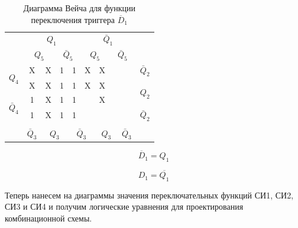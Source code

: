 \documentclass[a4paper,14pt]{article}
\begin{document}
\begin{table}[H]
	\begin{center}
		\caption{\label{tab:unD1_tab} Диаграмма Вейча для функции переключения триггера $\overline{D}_1$ }
	\begin{tabular}{cccccccccc}
		& \multicolumn{4}{c}{$Q_1$} & \multicolumn{4}{c}{$\bar{Q}_1$} &  \\
		& \multicolumn{2}{c}{$Q_5$} & \multicolumn{2}{c}{$\bar{Q}_5$} & \multicolumn{2}{c}{$Q_5$} & \multicolumn{2}{c}{$\bar{Q}_5$} &  \\ \cline{2-9}
		\multicolumn{1}{c|}{\multirow{2}{*}{$Q_4$}} & \multicolumn{1}{c|}{X} & \multicolumn{1}{c|}{X} & \multicolumn{1}{c|}{1} & \multicolumn{1}{c|}{1} & \multicolumn{1}{c|}{X} & \multicolumn{1}{c|}{X} & \multicolumn{1}{c|}{} & \multicolumn{1}{c|}{} & $\bar{Q}_2$ \\ \cline{2-9}
		\multicolumn{1}{c|}{} & \multicolumn{1}{c|}{X} & \multicolumn{1}{c|}{X} & \multicolumn{1}{c|}{1} & \multicolumn{1}{c|}{1} & \multicolumn{1}{c|}{X} & \multicolumn{1}{c|}{X} & \multicolumn{1}{c|}{} & \multicolumn{1}{c|}{} & \multirow{2}{*}{$Q_2$} \\ \cline{2-9}
		\multicolumn{1}{c|}{\multirow{2}{*}{$\bar{Q}_4$}} & \multicolumn{1}{c|}{1} & \multicolumn{1}{c|}{X} & \multicolumn{1}{c|}{1} & \multicolumn{1}{c|}{1} & \multicolumn{1}{c|}{} & \multicolumn{1}{c|}{X} & \multicolumn{1}{c|}{} & \multicolumn{1}{c|}{} &  \\ \cline{2-9}
		\multicolumn{1}{c|}{} & \multicolumn{1}{c|}{1} & \multicolumn{1}{c|}{X} & \multicolumn{1}{c|}{1} & \multicolumn{1}{c|}{1} & \multicolumn{1}{c|}{} & \multicolumn{1}{c|}{} & \multicolumn{1}{c|}{} & \multicolumn{1}{c|}{} & $\bar{Q}_2$ \\ \cline{2-9}
		&  & \multicolumn{2}{c}{} & \multicolumn{2}{c}{} & \multicolumn{2}{c}{} &  &  \\
		& $\bar{Q}_3$ & \multicolumn{2}{c}{$Q_3$} & \multicolumn{2}{c}{$\bar{Q}_3$} & \multicolumn{2}{c}{$Q_3$} & $\bar{Q}_3$ & 
	\end{tabular}
	\end{center}
\end{table}

$$\overline{D}_1 = Q_1$$

$$D_1 = \overline{Q_1}$$

Теперь нанесем на диаграммы значения переключательных функций СИ1, СИ2, СИ3 и СИ4 и получим логические уравнения для проектирования комбинационной схемы.

\end{document}
